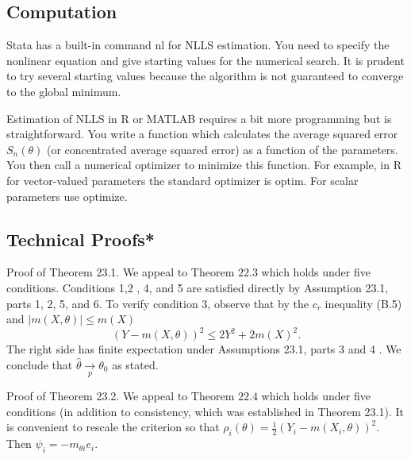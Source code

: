 \documentclass[10pt]{article}
\begin{document}
\subsection{Computation}
Stata has a built-in command nl for NLLS estimation. You need to specify the nonlinear equation and give starting values for the numerical search. It is prudent to try several starting values because the algorithm is not guaranteed to converge to the global minimum.

Estimation of NLLS in R or MATLAB requires a bit more programming but is straightforward. You write a function which calculates the average squared error $S_{n}(\theta)$ (or concentrated average squared error) as a function of the parameters. You then call a numerical optimizer to minimize this function. For example, in R for vector-valued parameters the standard optimizer is optim. For scalar parameters use optimize.

\subsection{Technical Proofs*}
Proof of Theorem 23.1. We appeal to Theorem $22.3$ which holds under five conditions. Conditions 1,2 , 4, and 5 are satisfied directly by Assumption 23.1, parts 1, 2, 5, and 6. To verify condition 3, observe that by the $c_{r}$ inequality (B.5) and $|m(X, \theta)| \leq m(X)$
$$
(Y-m(X, \theta))^{2} \leq 2 Y^{2}+2 m(X)^{2} .
$$
The right side has finite expectation under Assumptions 23.1, parts 3 and 4 . We conclude that $\widehat{\theta} \underset{p}{\longrightarrow} \theta_{0}$ as stated.

Proof of Theorem 23.2. We appeal to Theorem $22.4$ which holds under five conditions (in addition to consistency, which was established in Theorem 23.1). It is convenient to rescale the criterion so that $\rho_{i}(\theta)=\frac{1}{2}\left(Y_{i}-m\left(X_{i}, \theta\right)\right)^{2}$. Then $\psi_{i}=-m_{\theta i} e_{i}$.
\end{document}
